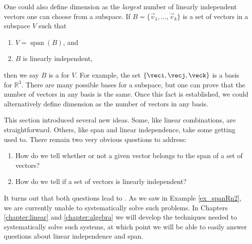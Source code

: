 \smallskip


\smallskip

One could also define dimension as the \textit{largest} number of linearly independent vectors one can choose from a subspace. If $B=\{\vec{v}_1, \ldots, \vec{v}_k\}$ is a set of vectors in a subspace $V$ such that 
\begin{enumerate}
\item $V=\operatorname{span}(B)$, and
\item $B$ is linearly independent,
\end{enumerate}
then we say $B$ is a  for $V$. For example, the set $\{\veci, \vecj, \veck\}$ is a basis for $\mathbb{R}^3$. There are many possible bases for a subspace, but one can prove that the number of vectors in any basis is the same. Once this fact is established, we could alternatively define dimension as the number of vectors in any basis.

\medskip

This section introduced several new ideas. Some, like linear combinations, are straightforward. Others, like span and linear independence, take some getting used to. There remain two very obvious questions to address:
\begin{enumerate}
\item How do we tell whether or not a given vector belongs to the span of a set of vectors?
\item How do we tell if a set of vectors is linearly independent?
\end{enumerate}
It turns out that both questions lead to . As we saw in Example \ref{ex_spanRn2}, we are currently unable to systematically solve such problems.  In Chapters \ref{chapter:linear} and \ref{chapter:algebra} we will develop the techniques needed to systematically solve such systems, at which point we will be able to easily answer questions about linear independence and span.

